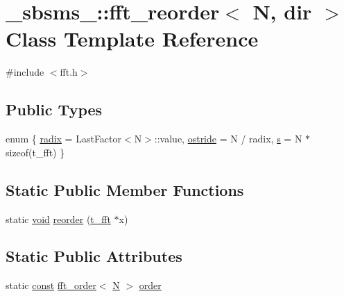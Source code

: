 \hypertarget{class__sbsms___1_1fft__reorder}{}\section{\+\_\+sbsms\+\_\+\+:\+:fft\+\_\+reorder$<$ N, dir $>$ Class Template Reference}
\label{class__sbsms___1_1fft__reorder}


{\ttfamily \#include $<$fft.\+h$>$}

\subsection*{Public Types}
\begin{DoxyCompactItemize}
\item 
enum \{ \hyperlink{class__sbsms___1_1fft__reorder_a2dc87d917c8d4e7f86d10e777ea42aeea17bb756d118b26ba061831d168c7c1c0}{radix} = Last\+Factor$<$N$>$\+:\+:value, 
\hyperlink{class__sbsms___1_1fft__reorder_a2dc87d917c8d4e7f86d10e777ea42aeea3d023c6c746928ed4a6e6df33ccaaad0}{ostride} = N / radix, 
\hyperlink{class__sbsms___1_1fft__reorder_a2dc87d917c8d4e7f86d10e777ea42aeea12e5addd44ed4f851adf0ed02c63ecc5}{s} = N $\ast$ sizeof(t\+\_\+fft)
 \}
\end{DoxyCompactItemize}
\subsection*{Static Public Member Functions}
\begin{DoxyCompactItemize}
\item 
static \hyperlink{sound_8c_ae35f5844602719cf66324f4de2a658b3}{void} \hyperlink{class__sbsms___1_1fft__reorder_a417299654336f8e502355c8a17d3805f}{reorder} (\hyperlink{namespace__sbsms___af5c6f976b2da21c36853e3b0c5995a54}{t\+\_\+fft} $\ast$x)
\end{DoxyCompactItemize}
\subsection*{Static Public Attributes}
\begin{DoxyCompactItemize}
\item 
static \hyperlink{getopt1_8c_a2c212835823e3c54a8ab6d95c652660e}{const} \hyperlink{class__sbsms___1_1fft__order}{fft\+\_\+order}$<$ \hyperlink{rfft2d_test_m_l_8m_af6d1246b147a7c5763d9fc83082020ff}{N} $>$ \hyperlink{class__sbsms___1_1fft__reorder_aee4c4a705da64986317feec371cdb392}{order}
\end{DoxyCompactItemize}


